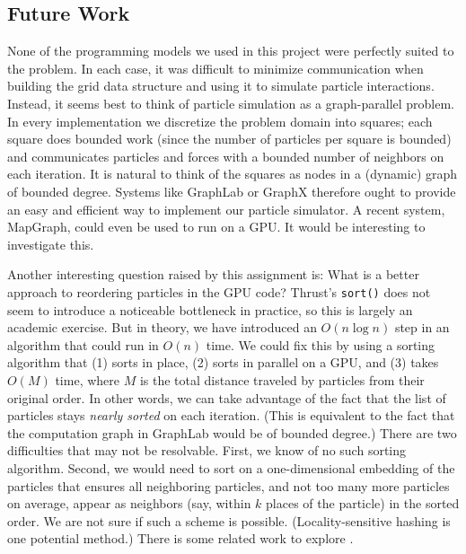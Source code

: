 \documentclass{article}
\newcommand{\code}[1]%
  {\texttt{#1}}
\begin{document}
\subsection{Future Work}
None of the programming models we used in this project were perfectly suited to the problem.  In each case, it was difficult to minimize communication when building the grid data structure and using it to simulate particle interactions.  Instead, it seems best to think of particle simulation as a graph-parallel problem.  In every implementation we discretize the problem domain into squares; each square does bounded work (since the number of particles per square is bounded) and communicates particles and forces with a bounded number of neighbors on each iteration.  It is natural to think of the squares as nodes in a (dynamic) graph of bounded degree.  Systems like GraphLab \cite{graphlab} or GraphX \cite{graphx} therefore ought to provide an easy and efficient way to implement our particle simulator.  A recent system, MapGraph, could even be used to run on a GPU.  It would be interesting to investigate this.

Another interesting question raised by this assignment is: What is a better approach to reordering particles in the GPU code?  Thrust's \code{sort()} does not seem to introduce a noticeable bottleneck in practice, so this is largely an academic exercise.  But in theory, we have introduced an $O(n \log n)$ step in an algorithm that could run in $O(n)$ time.  We could fix this by using a sorting algorithm that (1) sorts in place, (2) sorts in parallel on a GPU, and (3) takes $O(M)$ time, where $M$ is the total distance traveled by particles from their original order.  In other words, we can take advantage of the fact that the list of particles stays \emph{nearly sorted} on each iteration.  (This is equivalent to the fact that the computation graph in GraphLab would be of bounded degree.)  There are two difficulties that may not be resolvable.  First, we know of no such sorting algorithm.  Second, we would need to sort on a one-dimensional embedding of the particles that ensures all neighboring particles, and not too many more particles on average, appear as neighbors (say, within $k$ places of the particle) in the sorted order.  We are not sure if such a scheme is possible.  (Locality-sensitive hashing is one potential method.)  There is some related work to explore \cite{durand2012packed}.



\end{document}

